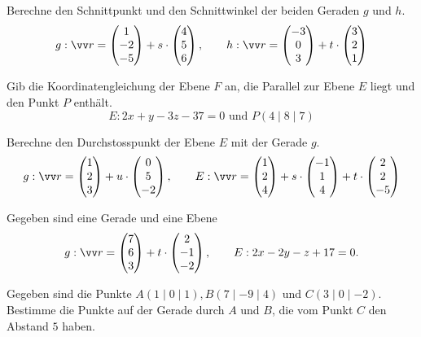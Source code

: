 \documentclass[11pt]{exam}
\begin{document}
\begin{questions}
\question[4]
Berechne den Schnittpunkt und den Schnittwinkel der beiden Geraden $g$ und $h$.
\[g:\v{r}=\Vec{1}{-2}{-5}+s\*\Vec{4}{5}{6}, \qquad h:\v{r}=\Vec{-3}{0}{3}+t\*\Vec{3}{2}{1}\]


\noaddpoints
\question[\totalpoints]
\addpoints
{}

\question[3]
Gib die Koordinatengleichung der Ebene $F$ an, die Parallel zur Ebene $E$ liegt und den Punkt $P$ enthält. \[E:2x+y-3z-37=0\text{ und } P(4\mid 8\mid 7)\]


\question[4]
Berechne den Durchstosspunkt der Ebene $E$ mit der Gerade $g$.
\[g:\v{r}=\Vec{1}{2}{3}+u\*\Vec{0}{5}{-2},\qquad E:\v{r}=\Vec{1}{2}{4}+s\*\Vec{-1}{1}{4}+t\*\Vec{2}{2}{-5}\]


\noaddpoints
\question[\totalpoints]
\addpoints
Gegeben sind eine Gerade und eine Ebene \[g:\v{r}=\Vec{7}{6}{3}+t\*\Vec{2}{-1}{-2},\qquad E:2x-2y-z+17=0.\]


\question[6]
Gegeben sind die Punkte $A(1\mid 0\mid 1), B(7\mid -9\mid 4)$ und $C(3\mid 0\mid -2)$. Bestimme die Punkte auf der Gerade durch $A$ und $B$, die vom Punkt $C$ den Abstand $5$ haben.



\end{questions}
\end{document}
